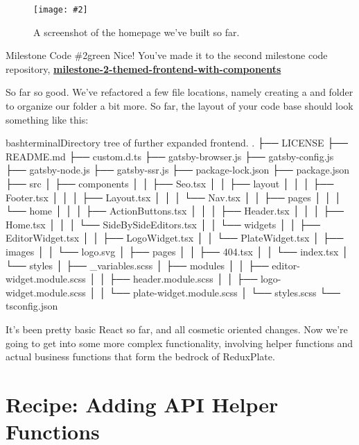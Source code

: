 \documentclass[a4paper,headinclude=on,footinclude=on,12pt,oneside]{scrbook}
\newcommand{\link}[2]{\textbf{\textcolor{monokaiPink}{\href{#2}{#1}}}}
\newcommand{\standardfigure}[3]{\begin{figure}[H]\begin{center}\texttt{[image: \#2]}\caption{#3}\label{fig:#2}\end{center}\end{figure}}
\begin{document}
\standardfigure{\textwidth}{frontend/homepage}{A screenshot of the homepage we've built so far.}


\begin{highlightBox}{Milestone Code \#2}{green}{\greenCheck}
Nice! You've made it to the second milestone code repository, \link{milestone-2-themed-frontend-with-components}{https://github.com/Full-Stack-SaaS-Product-Cookbook/milestone-2-themed-frontend-with-components}
\end{highlightBox}

So far so good. We've refactored a few file locations, namely creating a  and  folder to organize our  folder a bit more. So far, the layout of your code base should look something like this:

\begin{codeInput}{bash}{terminal}{Directory tree of further expanded frontend.}
.
├── LICENSE
├── README.md
├── custom.d.ts
├── gatsby-browser.js
├── gatsby-config.js
├── gatsby-node.js
├── gatsby-ssr.js
├── package-lock.json
├── package.json
├── src
│   ├── components
│   │   ├── Seo.tsx
│   │   ├── layout
│   │   │   ├── Footer.tsx
│   │   │   ├── Layout.tsx
│   │   │   └── Nav.tsx
│   │   ├── pages
│   │   │   └── home
│   │   │       ├── ActionButtons.tsx
│   │   │       ├── Header.tsx
│   │   │       ├── Home.tsx
│   │   │       └── SideBySideEditors.tsx
│   │   └── widgets
│   │       ├── EditorWidget.tsx
│   │       ├── LogoWidget.tsx
│   │       └── PlateWidget.tsx
│   ├── images
│   │   └── logo.svg
│   ├── pages
│   │   ├── 404.tsx
│   │   └── index.tsx
│   └── styles
│       ├── _variables.scss
│       ├── modules
│       │   ├── editor-widget.module.scss
│       │   ├── header.module.scss
│       │   ├── logo-widget.module.scss
│       │   └── plate-widget.module.scss
│       └── styles.scss
└── tsconfig.json
\end{codeInput}

It's been pretty basic React so far, and all cosmetic oriented changes. Now we're going to get into some more complex functionality, involving helper functions and actual business functions that form the bedrock of ReduxPlate.

\section{Recipe: Adding API Helper Functions}
\end{document}
